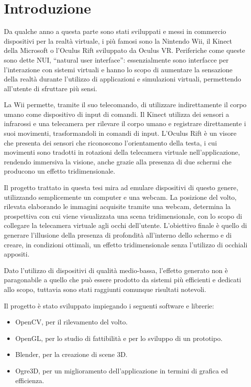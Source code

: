
\chapter*{Introduzione}

Da qualche anno a questa parte sono stati sviluppati e messi in commercio dispositivi per la realtà virtuale, i più famosi sono la Nintendo Wii, il Kinect della Microsoft o l'Oculus Rift sviluppato da Oculus VR. Periferiche come queste sono dette NUI, “natural user interface”\cite{NUI}: essenzialmente sono interfacce per l'interazione con sistemi virtuali e hanno lo scopo di aumentare la sensazione della realtà durante l'utilizzo di applicazioni e simulazioni virtuali, permettendo all'utente di sfruttare più sensi.

La Wii permette, tramite il suo telecomando, di utilizzare indirettamente il corpo umano come dispositivo di input di comandi. Il Kinect utilizza dei sensori a infrarossi e una telecamera per rilevare il corpo umano e registrare direttamente i suoi movimenti, trasformandoli in comandi di input. L'Oculus Rift è un visore che presenta dei sensori che riconoscono l'orientamento della testa, i cui movimenti sono tradotti in rotazioni della telecamera virtuale nell'applicazione, rendendo immersiva la visione, anche grazie alla presenza di due schermi che producono un effetto tridimensionale.

Il progetto trattato in questa tesi mira ad emulare dispositivi di questo genere, utilizzando semplicemente un computer e una webcam. La posizione del volto, rilevata elaborando le immagini acquisite tramite una webcam, determina la prospettiva con cui viene visualizzata una scena tridimensionale, con lo scopo di collegare la telecamera virtuale agli occhi dell'utente. L'obiettivo finale è quello di generare l'illusione della presenza di profondità all'interno dello schermo e di creare, in condizioni ottimali, un effetto tridimensionale senza l'utilizzo di occhiali appositi.

Dato l'utilizzo di dispositivi di qualità medio-bassa, l'effetto generato non è paragonabile a quello che può essere prodotto da sistemi più efficienti e dedicati allo scopo, tuttavia sono stati raggiunti comunque risultati notevoli.

Il progetto è stato sviluppato impiegando i seguenti software e librerie:
\begin{itemize}
\item OpenCV, per il rilevamento del volto.
\item OpenGL, per lo studio di fattibilità e per lo sviluppo di un prototipo.
\item Blender, per la creazione di scene 3D.
\item Ogre3D, per un miglioramento dell'applicazione in termini di grafica ed efficienza.
\end{itemize}

